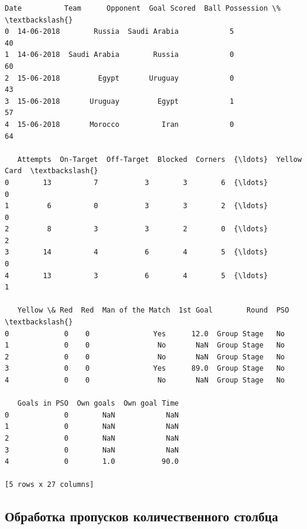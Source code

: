\documentclass[11pt, a4paper]{report}
\makeatletter
\newcommand{\boxspacing}{\kern\kvtcb@left@rule\kern\kvtcb@boxsep}
\newcommand{\prompt}[4]{
        {\ttfamily\llap{{\color{#2}[#3]:\hspace{3pt}#4}}\vspace{-\baselineskip}}
    }
\makeatother
\begin{document}
            \begin{tcolorbox}[breakable, size=fbox, boxrule=.5pt, pad at break*=1mm, opacityfill=0]
\prompt{Out}{outcolor}{5}{\boxspacing}
\begin{Verbatim}[commandchars=\\\{\}]
         Date          Team      Opponent  Goal Scored  Ball Possession \%  \textbackslash{}
0  14-06-2018        Russia  Saudi Arabia            5                 40
1  14-06-2018  Saudi Arabia        Russia            0                 60
2  15-06-2018         Egypt       Uruguay            0                 43
3  15-06-2018       Uruguay         Egypt            1                 57
4  15-06-2018       Morocco          Iran            0                 64

   Attempts  On-Target  Off-Target  Blocked  Corners  {\ldots}  Yellow Card  \textbackslash{}
0        13          7           3        3        6  {\ldots}            0
1         6          0           3        3        2  {\ldots}            0
2         8          3           3        2        0  {\ldots}            2
3        14          4           6        4        5  {\ldots}            0
4        13          3           6        4        5  {\ldots}            1

   Yellow \& Red  Red  Man of the Match  1st Goal        Round  PSO  \textbackslash{}
0             0    0               Yes      12.0  Group Stage   No
1             0    0                No       NaN  Group Stage   No
2             0    0                No       NaN  Group Stage   No
3             0    0               Yes      89.0  Group Stage   No
4             0    0                No       NaN  Group Stage   No

   Goals in PSO  Own goals  Own goal Time
0             0        NaN            NaN
1             0        NaN            NaN
2             0        NaN            NaN
3             0        NaN            NaN
4             0        1.0           90.0

[5 rows x 27 columns]
\end{Verbatim}
\end{tcolorbox}
        
    \hypertarget{ux43eux431ux440ux430ux431ux43eux442ux43aux430-ux43fux440ux43eux43fux443ux441ux43aux43eux432-ux43aux43eux43bux438ux447ux435ux441ux442ux432ux435ux43dux43dux43eux433ux43e-ux441ux442ux43eux43bux431ux446ux430}{%
\subsection{Обработка пропусков количественного
столбца}\label{ux43eux431ux440ux430ux431ux43eux442ux43aux430-ux43fux440ux43eux43fux443ux441ux43aux43eux432-ux43aux43eux43bux438ux447ux435ux441ux442ux432ux435ux43dux43dux43eux433ux43e-ux441ux442ux43eux43bux431ux446ux430}}
\end{document}
